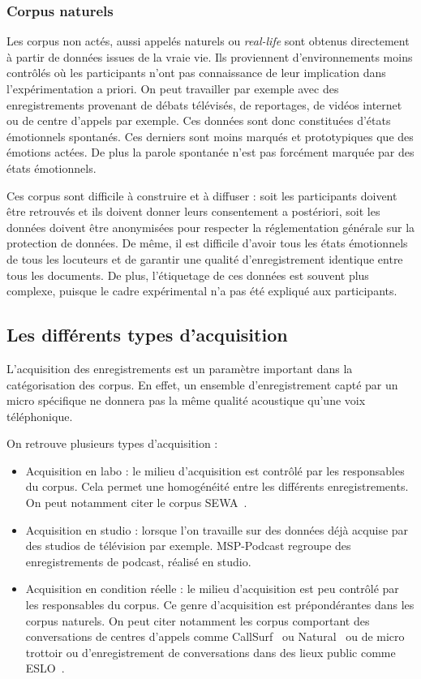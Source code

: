 \subsubsection{Corpus naturels}
Les corpus non actés, aussi appelés naturels ou \textit{real-life} sont obtenus directement à partir de données issues de la vraie vie. Ils proviennent d'environnements moins contrôlés où les participants n'ont pas connaissance de leur implication dans l'expérimentation a priori. On peut travailler par exemple avec des enregistrements provenant de débats télévisés, de reportages, de vidéos internet ou de centre d'appels par exemple. Ces données sont donc constituées d'états émotionnels spontanés. Ces derniers sont moins marqués et prototypiques que des émotions actées. De plus la parole spontanée n'est pas forcément marquée par des états émotionnels.

Ces corpus sont difficile à construire et à diffuser : soit les participants doivent être retrouvés et ils doivent donner leurs consentement a postériori, soit les données doivent être anonymisées pour respecter la réglementation générale sur la protection de données. De même, il est difficile d'avoir tous les états émotionnels de tous les locuteurs et de garantir une qualité d'enregistrement identique entre tous les documents.
De plus, l'étiquetage de ces données est souvent plus complexe, puisque le cadre expérimental n'a pas été expliqué aux participants.

\subsection{Les différents types d'acquisition}
L'acquisition des enregistrements est un paramètre important dans la catégorisation des corpus. En effet, un ensemble d'enregistrement capté par un micro spécifique ne donnera pas la même qualité acoustique qu'une voix téléphonique.

On retrouve plusieurs types d'acquisition :
\begin{itemize}
  \item Acquisition en labo : le milieu d'acquisition est contrôlé par les responsables du corpus. Cela permet une homogénéité entre les différents enregistrements. On peut notamment citer le corpus SEWA~\cite{SEWA}.
  \item Acquisition en studio : lorsque l'on travaille sur des données déjà acquise par des studios de télévision par exemple. MSP-Podcast\cite{Lotfian2019} regroupe des enregistrements de podcast, réalisé en studio.
  \item Acquisition en condition réelle : le milieu d'acquisition est peu contrôlé par les responsables du corpus. Ce genre d'acquisition est prépondérantes dans les corpus naturels. On peut citer notamment les corpus comportant des conversations de centres d'appels comme CallSurf~\cite{Garnier2008} ou Natural~\cite{Morrison2007} ou de micro trottoir ou d'enregistrement de conversations dans des lieux public comme ESLO~\cite{Eshkol2011}.
\end{itemize}

